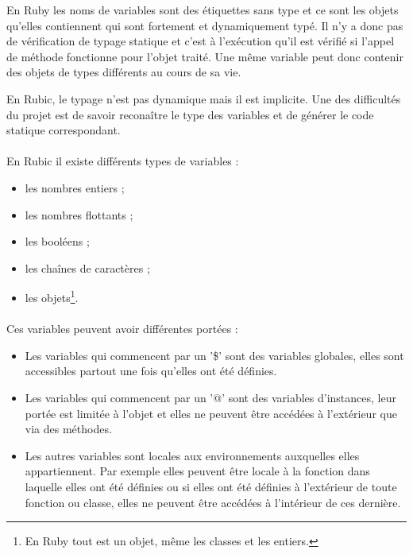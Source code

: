 \documentclass[12pt]{article}
\begin{document}
En Ruby les noms de variables sont des étiquettes sans type et ce sont les
objets qu'elles contiennent qui sont fortement et dynamiquement typé. Il n'y a
donc pas de vérification de typage statique et c'est à l'exécution qu'il est
vérifié si l'appel de méthode fonctionne pour l'objet traité. Une même
variable peut donc contenir des objets de types différents au cours de sa vie.

En Rubic, le typage n'est pas dynamique mais il est implicite. Une des
difficultés du projet est de savoir reconaître le type des variables et de
générer le code statique correspondant.

\paragraph{} En Rubic il existe différents types de variables :
\begin{itemize}
    \item les nombres entiers ;
    \item les nombres flottants ;
    \item les booléens ;
    \item les chaînes de caractères ;
    \item les objets\footnote{En Ruby tout est un objet, même les classes et
        les entiers.}.
\end{itemize}

\paragraph{}
Ces variables peuvent avoir différentes portées :
\begin{itemize}
    \item Les variables qui commencent par un '\$' sont des variables
        globales, elles sont accessibles partout une fois qu'elles ont été
        définies.
    \item Les variables qui commencent par un '@' sont des variables
        d'instances, leur portée est limitée à l'objet et elles ne peuvent
        être accédées à l'extérieur que via des méthodes.
    \item Les autres variables sont locales aux environnements auxquelles
        elles appartiennent. Par exemple elles peuvent être locale à la
        fonction dans laquelle elles ont été définies ou si elles ont été
        définies à l'extérieur de toute fonction ou classe, elles ne peuvent
        être accédées à l'intérieur de ces dernière.
\end{itemize}
\end{document}
